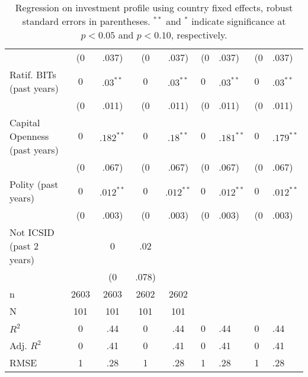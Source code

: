 \begin{table}[ht]
\begin{tabular}{lcccc}
   & (0&.037) & (0&.037) & (0&.037) & (0&.037) \\ 
  Ratif. BITs (past  years) & $0$&$.03^{\ast\ast}$ & $0$&$.03^{\ast\ast}$ & $0$&$.03^{\ast\ast}$ & $0$&$.03^{\ast\ast}$ \\ 
   & (0&.011) & (0&.011) & (0&.011) & (0&.011) \\ 
  Capital Openness (past  years) & $0$&$.182^{\ast\ast}$ & $0$&$.18^{\ast\ast}$ & $0$&$.181^{\ast\ast}$ & $0$&$.179^{\ast\ast}$ \\ 
   & (0&.067) & (0&.067) & (0&.067) & (0&.067) \\ 
  Polity (past  years) & $0$&$.012^{\ast\ast}$ & $0$&$.012^{\ast\ast}$ & $0$&$.012^{\ast\ast}$ & $0$&$.012^{\ast\ast}$ \\ 
   & (0&.003) & (0&.003) & (0&.003) & (0&.003) \\ 
  Not ICSID (past 2 years) &  & 0&.02 &  &  \\ 
   &  & (0&.078) &  &  \\ 
   \hline
n & 2603 & 2603 & 2602 & 2602 \\ 
  N & 101 & 101 & 101 & 101 \\ 
  $R^{2}$ & 0&.44 & 0&.44 & 0&.44 & 0&.44 \\ 
  Adj. $R^{2}$ & 0&.41 & 0&.41 & 0&.41 & 0&.41 \\ 
  RMSE & 1&.28 & 1&.28 & 1&.28 & 1&.28 \\ 
   \hline
\hline
\end{tabular}
\endgroup
\caption{Regression on investment profile using country fixed effects, robust standard errors in parentheses. $^{**}$ and $^{*}$ indicate significance at $p< 0.05 $ and $p< 0.10 $, respectively.} 
\end{table}
